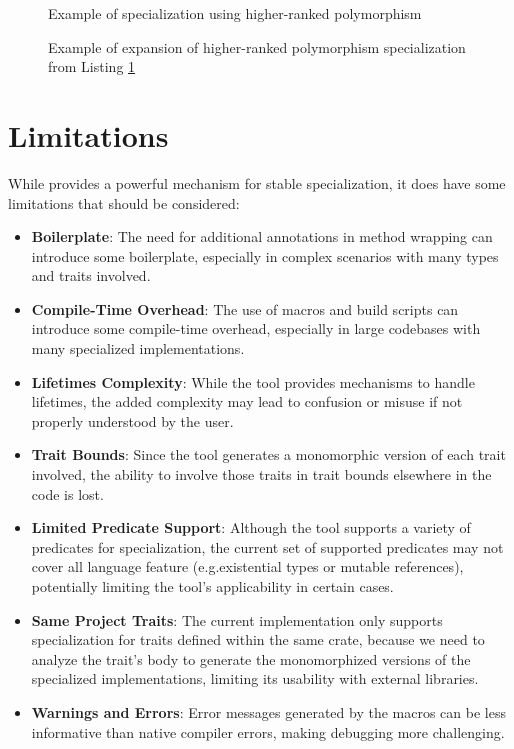 \begin{figure}[htbp!]
	\centering
	\captionsetup{type=listing,skip=2pt}
	\caption{Example of specialization using higher-ranked polymorphism}
	\label{fig:higher-ranked-pre}
\end{figure}

\begin{figure}[htbp!]
	\centering
	\captionsetup{type=listing,skip=2pt}
	\caption{Example of expansion of higher-ranked polymorphism specialization from Listing \ref{fig:higher-ranked-pre}}
	\label{fig:higher-ranked-post}
\end{figure}


\section{Limitations}\label{sec:limitations}
While \mytool{} provides a powerful mechanism for stable specialization, it does have some limitations that should be considered:
\begin{itemize}
	\item \textbf{Boilerplate}: The need for additional annotations in method wrapping can introduce some boilerplate, especially in complex scenarios with many types and traits involved.
	\item \textbf{Compile-Time Overhead}: The use of macros and build scripts can introduce some compile-time overhead, especially in large codebases with many specialized implementations.
	\item \textbf{Lifetimes Complexity}: While the tool provides mechanisms to handle lifetimes, the added complexity may lead to confusion or misuse if not properly understood by the user.
	\item \textbf{Trait Bounds}: Since the tool generates a monomorphic version of each trait involved, the ability to involve those traits in trait bounds elsewhere in the code is lost.
	\item \textbf{Limited Predicate Support}: Although the tool supports a variety of predicates for specialization, the current set of supported predicates may not cover all language feature (e.g.\@ existential types or mutable references), potentially limiting the tool's applicability in certain cases.
	\item \textbf{Same Project Traits}: The current implementation only supports specialization for traits defined within the same crate, because we need to analyze the trait's body to generate the monomorphized versions of the specialized implementations, limiting its usability with external libraries.
	\item \textbf{Warnings and Errors}: Error messages generated by the macros can be less informative than native compiler errors, making debugging more challenging.
\end{itemize}
